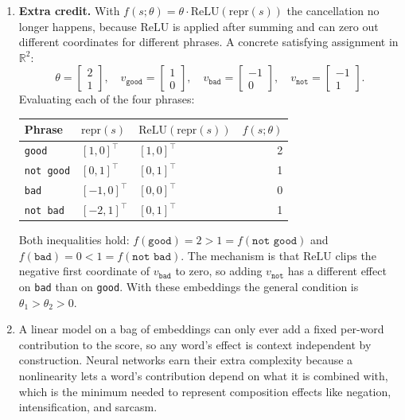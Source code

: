 \documentclass[11pt]{article}
\begin{document}
\begin{enumerate}
  \item \textbf{Extra credit.} With $f(s;\theta) = \theta\cdot\mathrm{ReLU}(\mathrm{repr}(s))$ the
        cancellation no longer happens, because $\mathrm{ReLU}$ is applied after summing and can zero out
        different coordinates for different phrases. A concrete satisfying assignment in $\mathbb{R}^2$:
        \[
          \theta = \begin{bmatrix} 2 \\ 1\end{bmatrix}, \quad
          v_{\texttt{good}} = \begin{bmatrix} 1 \\ 0\end{bmatrix}, \quad
          v_{\texttt{bad}} = \begin{bmatrix} -1 \\ 0\end{bmatrix}, \quad
          v_{\texttt{not}} = \begin{bmatrix} -1 \\ 1\end{bmatrix}.
        \]
        Evaluating each of the four phrases:
        \begin{center}
        \begin{tabular}{|l|l|l|r|}
          \hline
          Phrase & $\mathrm{repr}(s)$ & $\mathrm{ReLU}(\mathrm{repr}(s))$ & $f(s;\theta)$ \\
          \hline
          \texttt{good}     & $[1,0]^\top$  & $[1,0]^\top$ & 2 \\
          \texttt{not good} & $[0,1]^\top$  & $[0,1]^\top$ & 1 \\
          \texttt{bad}      & $[-1,0]^\top$ & $[0,0]^\top$ & 0 \\
          \texttt{not bad}  & $[-2,1]^\top$ & $[0,1]^\top$ & 1 \\
          \hline
        \end{tabular}
        \end{center}
        Both inequalities hold: $f(\texttt{good}) = 2 > 1 = f(\texttt{not good})$ and
        $f(\texttt{bad}) = 0 < 1 = f(\texttt{not bad})$. The mechanism is that
        $\mathrm{ReLU}$ clips the negative first coordinate of $v_{\texttt{bad}}$ to zero, so adding
        $v_{\texttt{not}}$ has a different effect on \texttt{bad} than on \texttt{good}. With these
        embeddings the general condition is $\theta_1 > \theta_2 > 0$.

  \item A linear model on a bag of embeddings can only ever add a fixed per-word contribution to the score,
        so any word's effect is context independent by construction. Neural networks earn their extra
        complexity because a nonlinearity lets a word's contribution depend on what it is combined with,
        which is the minimum needed to represent composition effects like negation, intensification, and
        sarcasm.
\end{enumerate}
\end{document}
